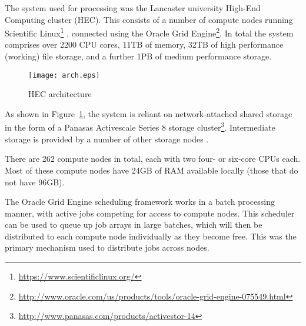 The system used for processing was the Lancaster university High-End Computing cluster (HEC).  This consists of a number of compute nodes running Scientific Linux\footnote{\url{https://www.scientificlinux.org/}}%
, connected using the Oracle Grid Engine\footnote{\url{http://www.oracle.com/us/products/tools/oracle-grid-engine-075549.html}}.  
In total the system comprises over 2200 CPU cores, 11TB of memory, 32TB of high performance (working) file storage, and a further 1PB of medium performance storage.


\begin{figure}[h]
    \centering
    \texttt{[image: arch.eps]}
    \caption{HEC architecture}
    \label{fig:arch}
\end{figure}

As shown in Figure~\ref{fig:arch}, the system is reliant on network-attached shared storage in the form of a Panasas Activescale Series 8 storage cluster\footnote{\url{http://www.panasas.com/products/activestor-14}}.  Intermediate storage is provided by a number of other storage nodes .

There are 262 compute nodes in total, each with two four- or six-core CPUs each.  Most of these compute nodes have 24GB of RAM available locally (those that do not have 96GB).

The Oracle Grid Engine scheduling framework works in a batch processing manner, with active jobs competing for access to compute nodes.  This scheduler can be used to queue up job arrays in large batches, which will then be distributed to each compute node individually as they become free.  This was the primary mechanism used to distribute jobs across nodes.

